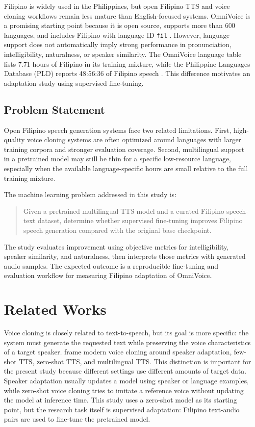 \documentclass[11pt]{article}
\begin{document}
Filipino is widely used in the Philippines, but open Filipino TTS and voice cloning workflows remain less mature than English-focused systems. OmniVoice is a promising starting point because it is open source, supports more than 600 languages, and includes Filipino with language ID \texttt{fil} \citep{omnivoice}. However, language support does not automatically imply strong performance in pronunciation, intelligibility, naturalness, or speaker similarity. The OmniVoice language table lists 7.71 hours of Filipino in its training mixture, while the Philippine Languages Database (PLD) reports 48:56:36 of Filipino speech \citep{pld}. This difference motivates an adaptation study using supervised fine-tuning.

\subsection{Problem Statement}

Open Filipino speech generation systems face two related limitations. First, high-quality voice cloning systems are often optimized around languages with larger training corpora and stronger evaluation coverage. Second, multilingual support in a pretrained model may still be thin for a specific low-resource language, especially when the available language-specific hours are small relative to the full training mixture.

The machine learning problem addressed in this study is:

\begin{quote}
Given a pretrained multilingual TTS model and a curated Filipino speech-text dataset, determine whether supervised fine-tuning improves Filipino speech generation compared with the original base checkpoint.
\end{quote}

The study evaluates improvement using objective metrics for intelligibility, speaker similarity, and naturalness, then interprets those metrics with generated audio samples. The expected outcome is a reproducible fine-tuning and evaluation workflow for measuring Filipino adaptation of OmniVoice.

\section{Related Works}

Voice cloning is closely related to text-to-speech, but its goal is more specific: the system must generate the requested text while preserving the voice characteristics of a target speaker. \citet{voicecloningsurvey} frame modern voice cloning around speaker adaptation, few-shot TTS, zero-shot TTS, and multilingual TTS. This distinction is important for the present study because different settings use different amounts of target data. Speaker adaptation usually updates a model using speaker or language examples, while zero-shot voice cloning tries to imitate a reference voice without updating the model at inference time. This study uses a zero-shot model as its starting point, but the research task itself is supervised adaptation: Filipino text-audio pairs are used to fine-tune the pretrained model.
\end{document}
